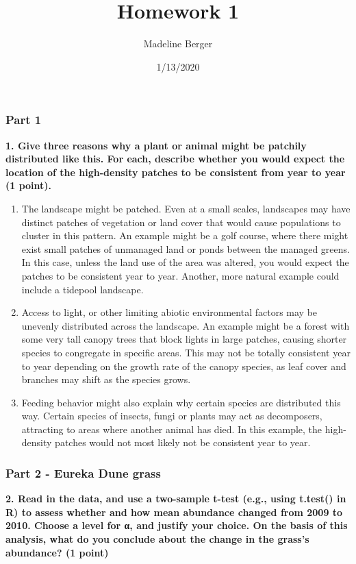 \documentclass[]{article}
\title{Homework 1}
\author{Madeline Berger}
\date{1/13/2020}
\begin{document}
\maketitle

\subsubsection{Part 1}\label{part-1}

\textbf{1. Give three reasons why a plant or animal might be patchily
distributed like this. For each, describe whether you would expect the
location of the high-density patches to be consistent from year to year
(1 point).}

\begin{enumerate}
\def\labelenumi{\arabic{enumi}.}
\item
  The landscape might be patched. Even at a small scales, landscapes may
  have distinct patches of vegetation or land cover that would cause
  populations to cluster in this pattern. An example might be a golf
  course, where there might exist small patches of unmanaged land or
  ponds between the managed greens. In this case, unless the land use of
  the area was altered, you would expect the patches to be consistent
  year to year. Another, more natural example could include a tidepool
  landscape.
\item
  Access to light, or other limiting abiotic environmental factors may
  be unevenly distributed across the landscape. An example might be a
  forest with some very tall canopy trees that block lights in large
  patches, causing shorter species to congregate in specific areas. This
  may not be totally consistent year to year depending on the growth
  rate of the canopy species, as leaf cover and branches may shift as
  the species grows.
\item
  Feeding behavior might also explain why certain species are
  distributed this way. Certain species of insects, fungi or plants may
  act as decomposers, attracting to areas where another animal has died.
  In this example, the high-density patches would not most likely not be
  consistent year to year.
\end{enumerate}

\subsubsection{Part 2 - Eureka Dune
grass}\label{part-2---eureka-dune-grass}

\textbf{2. Read in the data, and use a two-sample t-test (e.g., using
t.test() in R) to assess whether and how mean abundance changed from
2009 to 2010. Choose a level for α, and justify your choice. On the
basis of this analysis, what do you conclude about the change in the
grass's abundance? (1 point)}
\end{document}
